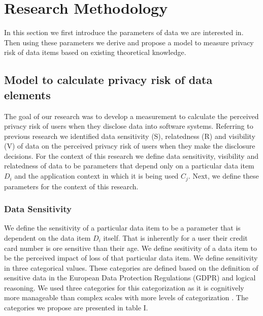 \documentclass[conference]{IEEEtran}
\begin{document}
\section {Research Methodology}

In this section we first introduce the parameters of data we are interested in. Then using these parameters we derive and propose a model to measure privacy risk of data items based on existing theoretical knowledge.

\subsection {Model to calculate privacy risk of data elements}

The goal of our research was to develop a measurement to calculate the perceived privacy risk of users when they disclose data into software systems. Referring to previous research we identified data sensitivity (S), relatedness (R) and visibility (V) of data on the perceived privacy risk of users when they make the disclosure decisions. For the context of this research we define data sensitivity, visibility and relatedness of data to be parameters that depend only on a particular data item \textit{$D_i$} and the application context in which it is being used \textit{$C_j$}. Next, we define these parameters for the context of this research.

\subsubsection{Data Sensitivity} We define the sensitivity of a particular data item to be a parameter that is dependent on the data item \textit{$D_i$} itself. That is inherently for a user their credit card number is ore sensitive than their age. We define sesitivity of a data item to be the perceived impact of loss of that particular data item. We define sensitivity in three categorical values. These categories are defined based on the definition of sensitive data in the European Data Protection Regulations (GDPR) \cite {wagner2016national} and logical reasoning. We used three categories for this categorization as it is cognitively more manageable than complex scales with more levels of categorization \cite {oetzel2014systematic}. The categories we propose are presented in table I.  
\end{document}
